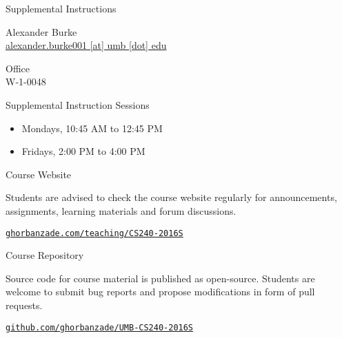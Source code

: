 \documentclass[compress]{beamer}
\begin{document}
\begin{slide}
	\begin{block}{Supplemental Instructions}

	Alexander Burke\\
	\href{mailto:alexander.burke001@umb.edu}{alexander.burke001 [at] umb [dot] edu}

	\par
	\vspace{0.5em}
	{\large Office}\\
	W-1-0048

	\par
	\vspace{0.5em}
	{\large Supplemental Instruction Sessions}
	\begin{itemize}
	\item[] Mondays, 10:45 AM to 12:45 PM
	\item[] Fridays, 2:00 PM to 4:00 PM
	\end{itemize}

	\end{block}
\end{slide}

\begin{slide}
	\begin{block}{Course Website}

	Students are advised to check the course website regularly for announcements, assignments, learning materials and forum discussions.

	\begin{center}
	\href{https://pejman.ghorbanzade.com/teaching/cs240-2016s}{\texttt{ghorbanzade.com/teaching/CS240-2016S}}
	\end{center}

	\end{block}
\end{slide}

\begin{slide}
	\begin{block}{Course Repository}

	Source code for course material is published as open-source.
	Students are welcome to submit bug reports and propose modifications in form of pull requests.

	\begin{center}
	\href{https://github.com/ghorbanzade/umb-cs240-2016s}{\texttt{github.com/ghorbanzade/UMB-CS240-2016S}}
	\end{center}

	\end{block}
\end{slide}
\end{document}
